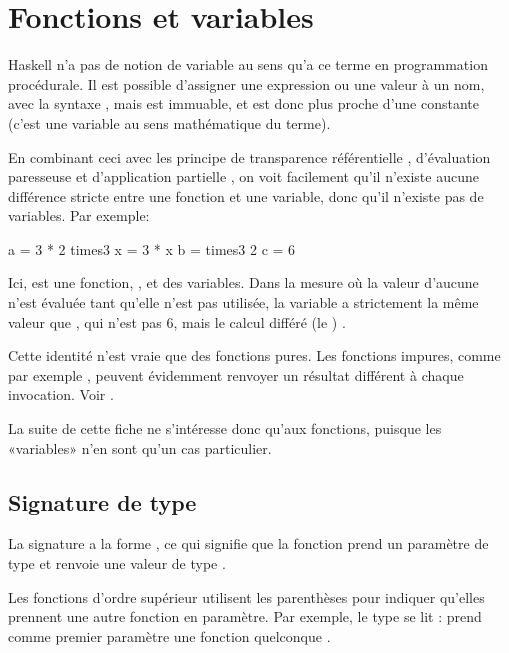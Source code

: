\section{Fonctions et variables}
\label{functions-and-variables}

Haskell n'a pas de notion de variable au sens qu'a ce terme en programmation procédurale. Il est possible d'assigner une expression ou une valeur à un nom, avec la syntaxe , mais  est immuable, et est donc plus proche d'une constante (c'est une variable au sens mathématique du terme).

En combinant ceci avec les principe de transparence référentielle , d'évaluation paresseuse  et d'application partielle , on voit facilement qu'il n'existe aucune différence stricte entre une fonction et une variable, donc qu'il n'existe pas de variables. Par exemple:


\begin{haskellcode}
a = 3 * 2
times3 x = 3 * x
b = times3 2
c = 6
\end{haskellcode}

Ici,  est une fonction, ,  et  des variables. Dans la mesure où la valeur d'aucune n'est évaluée tant qu'elle n'est pas utilisée, la variable  a strictement la même valeur que , qui n'est pas 6, mais le calcul différé (le ) .

\begin{warnbox}
Cette identité n'est vraie que des fonctions pures. Les fonctions impures, comme par exemple , peuvent évidemment renvoyer un résultat différent à chaque invocation. Voir .
\end{warnbox}

La suite de cette fiche ne s'intéresse donc qu'aux fonctions, puisque les «variables» n'en sont qu'un cas particulier.

\subsection{Signature de type}
\label{type-signatures}

La signature a la forme , ce qui signifie que la fonction prend un paramètre de type  et renvoie une valeur de type .

Les fonctions d'ordre supérieur utilisent les parenthèses pour indiquer qu'elles prennent une autre fonction en paramètre. Par exemple, le type  se lit :  prend comme premier paramètre une fonction quelconque .

